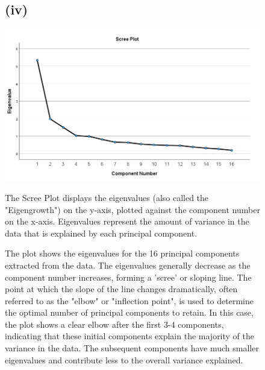 \documentclass[english,10pt,a4paper]{article}
\begin{document}
\begin{figure}
		\subsection*{(iv)}
	\includegraphics[width=1\linewidth]{scree plot.png}
	
The Scree Plot displays the eigenvalues (also called the "Eigengrowth") on the y-axis, plotted against the component number on the x-axis. Eigenvalues represent the amount of variance in the data that is explained by each principal component.

\newline The plot shows the eigenvalues for the 16 principal components extracted from the data.
The eigenvalues generally decrease as the component number increases, forming a 'scree' or sloping line.
The point at which the slope of the line changes dramatically, often referred to as the "elbow" or "inflection point", is used to determine the optimal number of principal components to retain.
In this case, the plot shows a clear elbow after the first 3-4 components, indicating that these initial components explain the majority of the variance in the data.
The subsequent components have much smaller eigenvalues and contribute less to the overall variance explained.
	
\end{figure}

\end{document}
